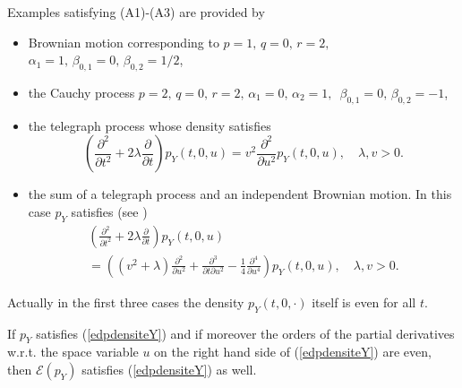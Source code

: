 \documentclass[a4paper, 11pt]{article}
\newcommand{\1}{\mathbf{1}}
\begin{document}
\bigskip

\noindent Examples satisfying (A1)-(A3) are provided by 
\begin{itemize}
\item Brownian motion corresponding to $p=1,\, q=0,\, r=2,\,$ $\alpha_1=1,\, \beta_{0,1}=0,\, \beta_{0,2}=1/2$, 
\item the Cauchy process $p=2,\, q=0,\, r=2,\,$$\alpha_1=0,\, \alpha_2=1,\, $ $\beta_{0,1}=0, \, \beta_{0,2}=-1$, 
\item the telegraph process whose density satisfies
\begin{equation*}
\left( \frac{\partial^2}{\partial t^2}+2\lambda \frac{\partial}{\partial t}\right)p_Y(t,0,u)=v^2\frac{\partial^2}{\partial u^2}p_Y(t,0,u), \quad \lambda, v>0.
\end{equation*}
\item the sum of a telegraph process and an independent Brownian motion. In this case $p_Y$ satisfies (see \cite{Blanchard1993225})
\begin{multline*}
\left( \frac{\partial^2}{\partial t^2}+2\lambda \frac{\partial}{\partial t}\right)p_Y(t,0,u)\\
=\left((v^2+\lambda)\frac{\partial^2}{\partial u^2}+\frac{\partial^3}{\partial t \partial u^2}-\frac{1}{4}\frac{\partial^4}{\partial u^4}\right)p_Y(t,0,u), \quad \lambda, v>0.
\end{multline*}
\end{itemize}
Actually in the first three cases the density $p_Y(t,0,\cdot)$ itself is even for all $t$. 

\medskip

\noindent If $p_Y$ satisfies (\ref{edpdensiteY}) and if moreover the orders of the partial derivatives w.r.t. the space variable $u$ on the right hand side of (\ref{edpdensiteY}) are even, then $\mathcal{E}(p_Y)$ satisfies (\ref{edpdensiteY}) as well.

\medskip
\end{document}
